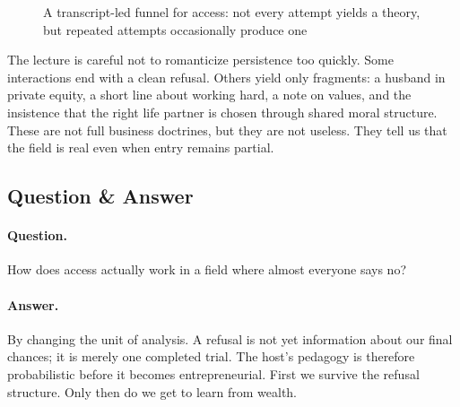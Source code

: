 \begin{figure}[h]
\centering
{}
\caption{A transcript-led funnel for access: not every attempt yields a theory, but repeated attempts occasionally produce one}
\end{figure}

The lecture is careful not to romanticize persistence too quickly. Some interactions end with a clean refusal. Others yield only fragments: a husband in private equity, a short line about working hard, a note on values, and the insistence that the right life partner is chosen through shared moral structure. These are not full business doctrines, but they are not useless. They tell us that the field is real even when entry remains partial.

\subsection{Question \& Answer}

\paragraph{Question.} How does access actually work in a field where almost everyone says no?

\paragraph{Answer.} By changing the unit of analysis. A refusal is not yet information about our final chances; it is merely one completed trial. The host's pedagogy is therefore probabilistic before it becomes entrepreneurial. First we survive the refusal structure. Only then do we get to learn from wealth.


